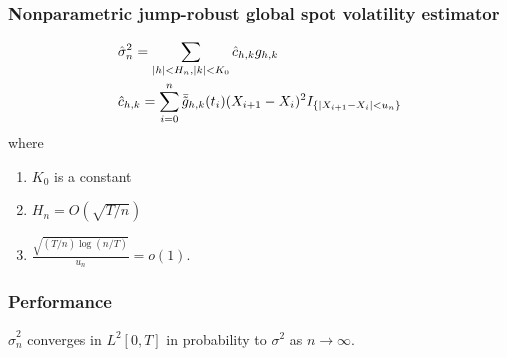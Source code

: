 \documentclass[fleqn]{beamer}
\begin{document}
\begin{frame}
  \frametitle{Nonparametric jump-robust global spot volatility estimator}
\begin{align}
  &\hat{\sigma}^2_n  = \sum_{\vert h \vert < H_n, \vert k\vert < K_0 } \hat{c}_{h,k} g_{h,k}\notag\\
  &\hat{c}_{h,k} = \sum^n_{i = 0} \bar{\tilde{g}}_{h,k}(t_i)(X_{i +1} - X_i)^2I_{\{\vert X_{i + 1} - X_i\vert < u_n\}} 
        \label{}
      \end{align}
      where 
      \begin{enumerate}
        \item 
          $K_0$ is a constant
        \item
      $H_n = O(\sqrt{T/n})$
    \item
      $\frac{\sqrt{(T/n) \log(n/T)}}{u_n} = o(1)$.
      \end{enumerate}
      
\end{frame}
\begin{frame}[allowframebreaks]
  \frametitle{Performance}
  \normalsize{
    }
    \framebreak
  \tiny{
    }
    \normalsize
  \framebreak
  \begin{theorem}
    $\hat{\sigma}^2_n$ converges in $L^2[0, T]$ in probability to $\sigma^2$ as $n \to \infty$.
      \end{theorem}
\end{frame}
\end{document}
